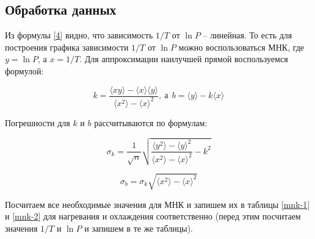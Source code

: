 \documentclass[a4paper,12pt]{article}
\begin{document}
\subsection{Обработка данных}

Из формулы \eqref{4} видно, что зависимость $1/T$ от $\ln{P}$ -- линейная. То есть для построения графика зависимости $1/T$ от $\ln{P}$ можно воспользоваться МНК, где $y = \ln{P}$, а $x = 1/T$. Для аппроксимации наилучшей прямой воспользуемся формулой:

\begin{equation}\label{mnk}
    k = \frac{\langle xy\rangle - \langle x \rangle \langle y \rangle}{\langle x^2 \rangle - \langle x \rangle^2},
    \ \text{а} \ \  b = \langle y \rangle - k\langle x \rangle
\end{equation}

Погрешности для $k$ и $b$ рассчитываются по формулам:

\begin{equation}
    \sigma_k = \frac{1}{\sqrt{n}} \sqrt{\frac{\langle y^2 \rangle - \langle y \rangle^2}{\langle x^2 \rangle - \langle x \rangle^2} - k^2}
\end{equation}

\begin{equation}
    \sigma_b = \sigma_k\sqrt{\langle x^2 \rangle - \langle x \rangle^2}
\end{equation}

Посчитаем все необходимые значения для МНК и запишем их в таблицы \ref{mnk-1} и \ref{mnk-2} для нагревания и охлаждения соответственно (перед этим посчитаем значения $1/T$ и $\ln{P}$ и запишем в те же таблицы).
\end{document}
